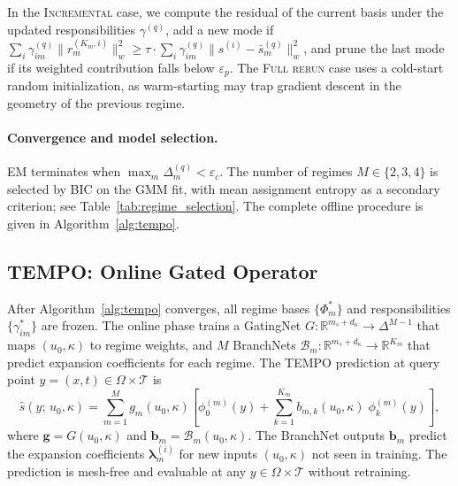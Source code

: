 \documentclass{article}
\begin{document}
\noindent
In the \textsc{Incremental} case, we compute the residual of the
current basis under the updated responsibilities $\gamma^{(q)}$, add
a new mode if $\sum_i \gamma_{im}^{(q)}\|r_m^{(K_m,i)}\|_w^2 \ge \tau\cdot\sum_i \gamma_{im}^{(q)}\|s^{(i)}-\bar{s}_m^{(q)}\|_w^2$,
and prune the last mode if its weighted contribution falls below
$\varepsilon_p$.
The \textsc{Full rerun} case uses a cold-start random initialization,
as warm-starting may trap gradient descent in the geometry of the previous regime.

\paragraph{Convergence and model selection.}
EM terminates when $\max_m \Delta_m^{(q)} < \varepsilon_c$.
The number of regimes $M \in \{2,3,4\}$ is selected by BIC on the GMM fit,
with mean assignment entropy as a secondary criterion;
see Table~\ref{tab:regime_selection}.
The complete offline procedure is given in Algorithm~\ref{alg:tempo}.

\subsection{TEMPO: Online Gated Operator}\label{sec:online}


After Algorithm~\ref{alg:tempo} converges, all regime bases
$\{\Phi_m^*\}$ and responsibilities $\{\gamma_{im}^*\}$ are frozen.
The online phase trains a GatingNet
$G: \mathbb{R}^{m_s + d_\kappa} \to \Delta^{M-1}$
that maps $(u_0, \kappa)$ to regime weights, and $M$ BranchNets
$\mathcal{B}_m: \mathbb{R}^{m_s + d_\kappa} \to \mathbb{R}^{K_m}$
that predict expansion coefficients for each regime.
The TEMPO prediction at query point $y = (x,t) \in \Omega\times\mathcal{T}$ is
\begin{equation}
  \hat{s}(y;\,u_0,\kappa)
  = \sum_{m=1}^{M} g_m(u_0,\kappa)
    \left[
      \phi_0^{(m)}\!(y)
      + \sum_{k=1}^{K_m}
        b_{m,k}(u_0,\kappa)\;
        \phi_k^{(m)}\!(y)
    \right],
  \label{eq:predict}
\end{equation}
where $\mathbf{g} = G(u_0,\kappa)$ and
$\mathbf{b}_m = \mathcal{B}_m(u_0,\kappa)$.
The BranchNet outputs $\mathbf{b}_m$ predict the expansion coefficients
$\boldsymbol{\lambda}_m^{(i)}$ for new inputs $(u_0,\kappa)$ not seen in training.
The prediction is mesh-free and evaluable at any $y\in\Omega\times\mathcal{T}$
without retraining.
\end{document}
